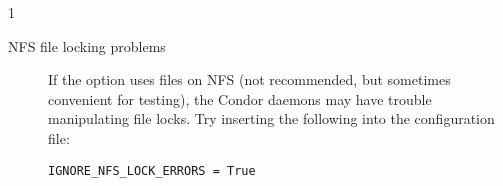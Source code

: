 \begin{ManPage}{\label{man-condor-glidein}}{1}
\begin{description}
\item[NFS file locking problems]  If the  option
uses files
on NFS (not recommended, but sometimes convenient
for testing), the Condor daemons may have trouble manipulating file
locks.  Try inserting the following into the configuration file:

\begin{verbatim}
IGNORE_NFS_LOCK_ERRORS = True
\end{verbatim}

\end{description}

\end{ManPage}
